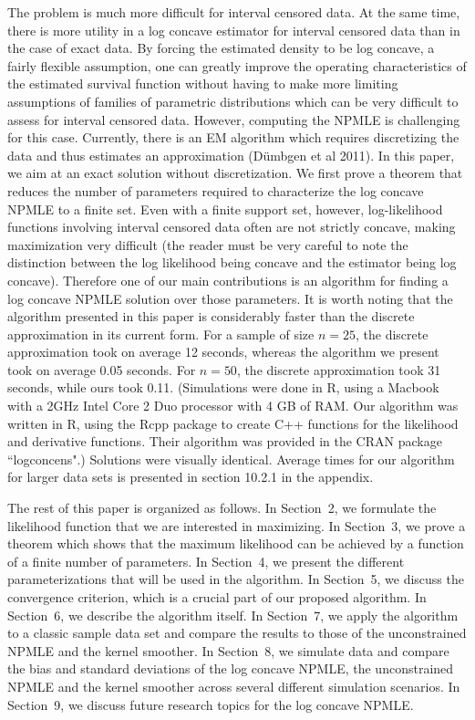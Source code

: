 \documentclass[12pt]{article}
\numberwithin{equation}{section}
\begin{document}
	The problem is much more difficult for interval censored data. At the same time, there is more utility in a log concave estimator for interval censored data than in the case of exact data. By forcing the estimated density to be log concave, a fairly flexible assumption, one can greatly improve the operating characteristics of the estimated survival function without having to make more limiting assumptions of families of parametric distributions which can be very difficult to assess for interval censored data. However, computing the NPMLE is challenging for this case. Currently, there is an EM algorithm which requires discretizing the data and thus estimates an approximation (D\"umbgen et al 2011). In this paper, we aim at an exact solution without discretization.  We first prove a theorem that reduces the number of parameters required to characterize the log concave NPMLE to a finite set.  Even with a finite support set, however, log-likelihood functions involving interval censored data often are not strictly concave, making maximization very difficult (the reader must be very careful to note the distinction between the log likelihood being concave and the estimator being log concave). Therefore one of our main contributions is an algorithm for finding a log concave NPMLE solution over those parameters. It is worth noting that the algorithm presented in this paper is considerably faster than the discrete approximation in its current form. For a sample of size $n = 25$, the discrete approximation took on average 12 seconds, whereas the algorithm we present took on average 0.05 seconds. For $n = 50$, the discrete approximation took 31 seconds, while ours took 0.11. (Simulations were done in R, using a Macbook with a 2GHz Intel Core 2 Duo processor with 4 GB of RAM. Our algorithm was written in R, using the Rcpp package to create C++ functions for the likelihood and derivative functions. Their algorithm was provided in the CRAN package ``logconcens".) Solutions were visually identical. Average times for our algorithm for larger data sets is presented in section 10.2.1 in the appendix.
	
	The rest of this paper is organized as follows.  In Section~2, we formulate the likelihood function that we are interested in maximizing. In Section~3, we prove a theorem which shows that the maximum likelihood can be achieved by a function of a finite number of parameters. In Section~4, we present the different parameterizations that will be used in the algorithm. In Section~5, we discuss the convergence criterion, which is a crucial part of our proposed algorithm. In Section~6, we describe the algorithm itself. In Section~7, we apply the algorithm to a classic sample data set and compare the results to those of the unconstrained NPMLE and the kernel smoother. In Section~8, we simulate data and compare the bias and standard deviations of the log concave NPMLE, the unconstrained NPMLE and the kernel smoother across several different simulation scenarios. In Section~9, we discuss future research topics for the log concave NPMLE.
	 
\end{document}
